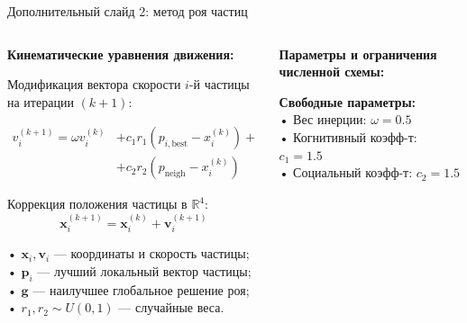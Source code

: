 \begin{frame}{Дополнительный слайд 2: метод роя частиц}
	\vfill
	
	\begin{columns}[T]
		
		\begin{column}{0.51\textwidth}
			\textbf{Кинематические уравнения движения:}
			\begin{tcolorbox}[
				colframe=DeepBlue!35, 
				colback=DeepBlue!1!Ivory, 
				coltext=DeepBlue, 
				boxrule=0.5pt, arc=3pt, 
				top=4pt, bottom=4pt, left=4pt, right=4pt,
				before=\vspace{3pt}, after=\vspace{0pt},
				equal height group=pso_details
				]
				\footnotesize
				Модификация вектора скорости $i$-й частицы на итерации $(k+1)$:
				{\centering $\displaystyle
					\begin{aligned}
						v_i^{(k+1)} = \omega v_i^{(k)} &+ c_1 r_1 \left( 	p_{i,\mathrm{best}} - x_i^{(k)} \right) + \\
						&+ c_2 r_2 \left( p_{\mathrm{neigh}} - x_i^{(k)} \right)
					\end{aligned}$ \par}
				
				\vspace{0.05cm}
				Коррекция положения частицы в $\mathbb{R}^4$:
				$$\mathbf{x}_i^{(k+1)} = \mathbf{x}_i^{(k)} + \mathbf{v}_i^{(k+1)}$$
				
				\vspace{0.05cm}
				• $\mathbf{x}_i, \mathbf{v}_i$ --- координаты и скорость частицы; \\
				• $\mathbf{p}_i$ --- лучший локальный вектор частицы; \\
				• $\mathbf{g}$ --- наилучшее глобальное решение роя;  \\
				• $r_1, r_2 \sim U(0, 1)$ --- случайные веса.
			\end{tcolorbox}
		\end{column}
		
		\begin{column}{0.47\textwidth}
			\textbf{Параметры и ограничения численной схемы:}
			\begin{tcolorbox}[
				colframe=Burgundy!35, 
				colback=Burgundy!1!Ivory, 
				coltext=DeepBlue, 
				boxrule=0.5pt, arc=3pt, 
				top=4pt, bottom=4pt, left=4pt, right=4pt,
				before=\vspace{3pt}, after=\vspace{0pt},
				equal height group=pso_details
				]
				\footnotesize
				\textbf{Свободные параметры:}\\
				• Вес инерции: $\omega = 0.5$ \\
				• Когнитивный коэфф-т: $c_1 = 1.5$ \\
				• Социальный коэфф-т: $c_2 = 1.5$
				

\end{tcolorbox}
\end{column}
\end{columns}
\end{frame}
